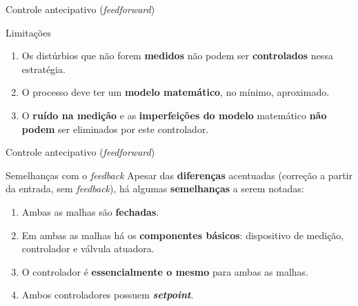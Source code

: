 \begin{frame}{Controle antecipativo (\textit{feedforward})}
	\begin{block}{Limitações}
		\begin{enumerate}
			\item Os distúrbios que não forem \textbf{medidos} não podem ser \textbf{controlados} nessa estratégia.
			\item O processo deve ter um \textbf{modelo matemático}, no mínimo, aproximado.
			\item O \textbf{ruído na medição} e as \textbf{imperfeições do modelo} matemático \textbf{não podem} ser eliminados por este controlador.
		\end{enumerate}
	\end{block}
\end{frame}


\begin{frame}{Controle antecipativo (\textit{feedforward})}
	\begin{block}{Semelhanças com o \textit{feedback}}
		Apesar das \textbf{diferenças} acentuadas (correção a partir da entrada, sem \textit{feedback}), há algumas \textbf{semelhanças} a serem notadas:
		\begin{enumerate}
			\item Ambas as malhas são \textbf{fechadas}.
			\item Em ambas as malhas há os \textbf{componentes básicos}: dispositivo de medição, controlador e válvula atuadora.
			\item O controlador é \textbf{essencialmente o mesmo} para ambas as malhas.
			\item Ambos controladores possuem \textbf{\textit{setpoint}}.
		\end{enumerate}
	\end{block}
\end{frame}



